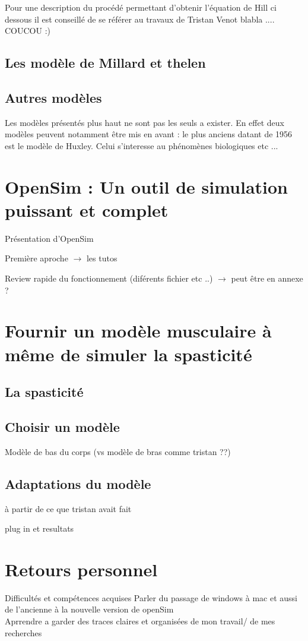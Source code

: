 Pour une description du procédé permettant d'obtenir l'équation de Hill ci dessous il est conseillé de se référer au travaux de Tristan Venot blabla .... COUCOU :)  


\section{Les modèle de Millard et thelen}

\section{Autres modèles}
Les modèles présentés plus haut ne sont pas les seuls a exister. En effet deux modèles peuvent notamment être mis en avant : le plus anciens datant de 1956 est le modèle de Huxley. Celui s'interesse au phénomènes biologiques etc ... \cite{huxley_muscle_1957}
\chapter{OpenSim : Un outil de simulation puissant et complet}

Présentation d'OpenSim 

Première aproche $\rightarrow$ les tutos

Review rapide du fonctionnement (diférents fichier etc ..) $\rightarrow$ peut être en annexe ? 
\chapter{Fournir un modèle musculaire à même de simuler la spasticité}
\section{La spasticité}
\section{Choisir un modèle}
Modèle de bas du corps (vs modèle de bras comme tristan ??)
\section{Adaptations du modèle}
à partir de ce que tristan avait fait 

plug in et resultats 
\chapter{Retours personnel}
Difficultés et compétences acquises 
Parler du passage de windows à mac et aussi de l'ancienne à la nouvelle version de openSim \\

Aprrendre a garder des traces claires et organisées de mon travail/ de mes recherches 